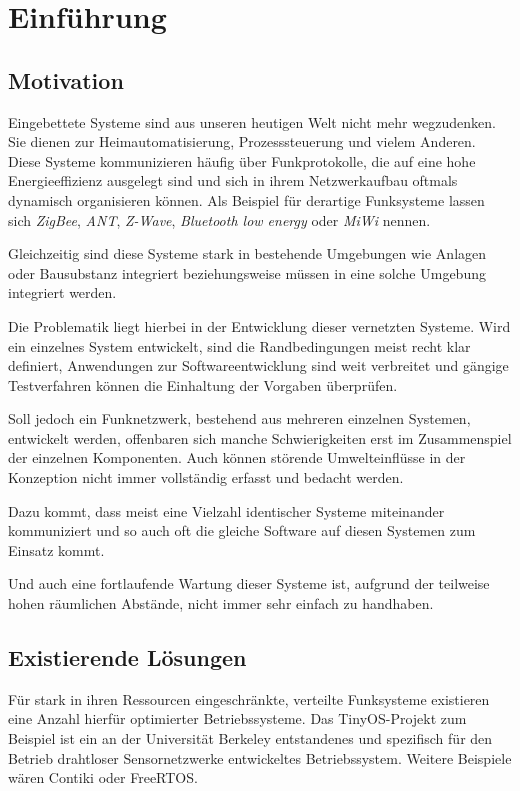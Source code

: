 \chapter{Einführung}
\adjustmtc
\minitoc
\section{Motivation}
Eingebettete Systeme sind aus unseren heutigen Welt nicht mehr wegzudenken. Sie
dienen zur Heimautomatisierung, Prozesssteuerung und vielem
Anderen. Diese Systeme kommunizieren häufig über Funkprotokolle, die auf eine
hohe Energieeffizienz ausgelegt sind und sich in ihrem Netzwerkaufbau oftmals
dynamisch organisieren können. Als Beispiel für derartige Funksysteme lassen
sich \emph{ZigBee}, \emph{ANT}, \emph{Z-Wave}, \emph{Bluetooth low energy} oder
\emph{MiWi} nennen.

Gleichzeitig sind diese Systeme stark in bestehende Umgebungen wie Anlagen oder
Bausubstanz integriert beziehungsweise müssen in eine solche Umgebung
integriert werden.

Die Problematik liegt hierbei in der Entwicklung dieser vernetzten Systeme. Wird
ein einzelnes System entwickelt, sind die Randbedingungen meist recht klar
definiert, Anwendungen zur Softwareentwicklung sind weit verbreitet und gängige
Testverfahren können die Einhaltung der Vorgaben überprüfen.

Soll jedoch ein Funknetzwerk, bestehend aus mehreren einzelnen Systemen,
entwickelt werden, offenbaren sich manche Schwierigkeiten erst im
Zusammenspiel der einzelnen Komponenten. Auch können störende
Umwelteinflüsse in der Konzeption nicht immer vollständig erfasst und
bedacht werden.

Dazu kommt, dass meist eine Vielzahl identischer Systeme miteinander
kommuniziert und so auch oft die gleiche Software auf diesen Systemen zum
Einsatz kommt.

Und auch eine fortlaufende Wartung dieser Systeme ist, aufgrund der teilweise
hohen räumlichen Abstände, nicht immer sehr einfach zu handhaben. 

\section{Existierende Lösungen}\label{sec:exist}
Für stark in ihren Ressourcen eingeschränkte, verteilte Funksysteme existieren
eine Anzahl hierfür optimierter Betriebssysteme. Das TinyOS-Projekt\cite{TINY}
zum Beispiel ist ein an der Universität Berkeley entstandenes und spezifisch für
den Betrieb drahtloser Sensornetzwerke entwickeltes Betriebssystem. Weitere
Beispiele wären Contiki\cite{CONT} oder FreeRTOS\cite{FREE}.

